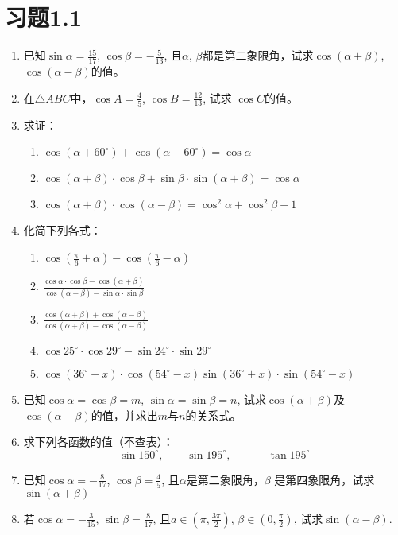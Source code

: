 \section*{习题1.1}
\begin{enumerate}
\item 已知$\sin\alpha=\frac{15}{17}$, $\cos\beta=-\frac{5}{13}$, 且$\alpha$, $\beta$都是第二象限角，试求$\cos(\alpha+\beta)$, $\cos(\alpha-\beta)$的值。
\item 在$\triangle ABC$中，$\cos A=\frac{4}{5}$, $\cos B=\frac{12}{13}$, 试求 $\cos C$的值。
\item 求证：
\begin{enumerate}
    \item $\cos (\alpha+60^{\circ}) +\cos (\alpha-60^{\circ}) =\cos\alpha$
    \item $\cos (\alpha+\beta)\cdot \cos\beta+\sin\beta\cdot \sin(\alpha+\beta) =\cos\alpha$
    \item $\cos (\alpha+\beta)\cdot \cos (\alpha-\beta) =\cos^2\alpha+\cos^2\beta-1$
\end{enumerate}
\item 化简下列各式：
\begin{enumerate}
    \item $\cos\left(\frac{\pi}{6}+\alpha\right)-\cos\left(\frac{\pi}{6}-\alpha\right)$
    \item $\frac{\cos\alpha\cdot \cos\beta-\cos (\alpha+\beta)}{\cos (\alpha-\beta)-\sin\alpha\cdot \sin\beta}$
    \item $\frac{\cos (\alpha+\beta)+\cos(\alpha-\beta)}{\cos (\alpha+\beta)-\cos (\alpha-\beta)}$
    \item $\cos25^{\circ}\cdot \cos29^{\circ}-\sin24^{\circ}\cdot \sin29^{\circ}$
    \item $\cos (36^{\circ}+x)\cdot \cos (54^{\circ}-x)\sin (36^{\circ}+x)\cdot \sin (54^{\circ}-x)$
\end{enumerate} 

\item 已知$\cos\alpha=\cos\beta=m$, $\sin\alpha=\sin\beta=n$, 试求$\cos(\alpha+\beta)$及$\cos(\alpha-\beta)$的值，并求出$m$与$n$的关系式。
\item 求下列各函数的值（不查表）：
\[\sin150^{\circ},\qquad \sin195^{\circ},\qquad -\tan 195^{\circ}\]
\item 已知$\cos\alpha=-\frac{8}{17}$, $\cos\beta=\frac{4}{5}$,
且$\alpha$是第二象限角，$\beta$
是第四象限角，试求$\sin(\alpha+\beta)$

\item 若$\cos\alpha=-\frac{3}{15}$, $\sin\beta=\frac{8}{17}$, 且$a\in\left(\pi,\frac{3\pi}{2}\right)$,
$\beta\in \left(0,\frac{\pi}{2}\right)$, 试求$\sin(\alpha-\beta)$.



\end{enumerate}
